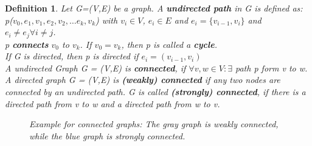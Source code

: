 \documentclass[10pt,a4paper]{article}
\newtheorem {defi}{Definition}[section]
\begin{document}
\begin{defi}
	Let G=(V,E) be a graph. A \textbf{undirected path} in G is defined as: p($v_0, e_1, v_1, e_2, v_2, \dots e_k, v_k$) with $v_i \in V$, $e_i \in E$ and $e_i =\{v_{i-1}, v_i\}$ and $e_i \neq e_j \forall i \neq j$. \\
	p \textbf{connects} $v_0$ to $v_k$. If $v_0 = v_k$, then p is called a \textbf{cycle}. \\
	If G is directed, then p is directed if $e_i = (v_{i-1}, v_i)$\\
	A undirected Graph G = (V,E) is \textbf{connected}, if $\forall v,w \in V: \exists $ path p form v to w. \\
	A directed graph G = (V,E) is \textbf{(weakly) connected} if any two nodes are connected by an undirected path. G is called \textbf{(strongly) connected}, if there is a directed path from v to w and a directed path from w to v. 
	
	\begin{figure}[h!]
		\centering
		\caption{Example for connected graphs: The gray graph is weakly connected, while the blue graph is strongly connected.}
	\end{figure}
\end{defi}
\end{document}
